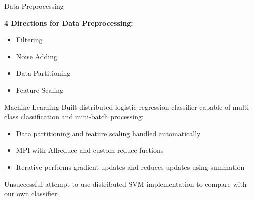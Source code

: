 \documentclass{beamer}
\begin{document}
\begin{frame}{Data Preprocessing}

\textbf{4 Directions for Data Preprocessing:}
\begin{itemize}
\item Filtering
\item Noise Adding
\item Data Partitioning
\item Feature Scaling
\end{itemize}

\end{frame}

\begin{frame}{Machine Learning}
Built distributed logistic regression classifier capable of multi-class classification and mini-batch processing:

\begin{itemize}
\item Data partitioning and feature scaling handled automatically
\item MPI with Allreduce and custom reduce fuctions
\item Iterative performs gradient updates and reduces updates using summation
\end{itemize}

Unsuccessful attempt to use distributed SVM implementation to compare with our own classifier.

\end{frame}
\end{document}
